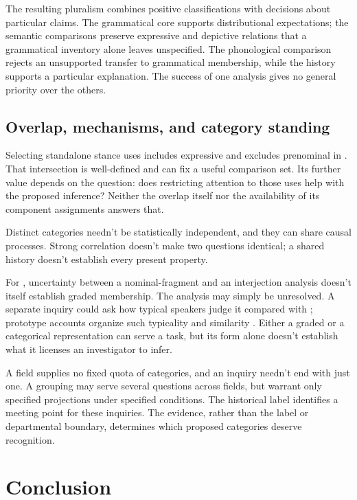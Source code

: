 \documentclass[12pt]{article}
\begin{document}
The resulting pluralism combines positive classifications with decisions
about particular claims. The grammatical core supports distributional
expectations; the semantic comparisons preserve expressive and depictive
relations that a grammatical inventory alone leaves unspecified.
The phonological comparison rejects an unsupported transfer to grammatical
membership, while the  history supports a particular explanation.
The success of one analysis gives no general priority over the others.

\subsection{Overlap, mechanisms, and category standing}

Selecting standalone stance uses includes expressive 
and excludes prenominal  in . That
intersection is well-defined and can fix a useful comparison set.
Its further value depends on the question: does restricting attention
to those uses help with the proposed inference? Neither the overlap
itself nor the availability of its component assignments answers that.

Distinct categories needn't be statistically independent, and they can
share causal processes. Strong correlation doesn't make two questions
identical; a shared history doesn't establish every present property.

For , uncertainty between a nominal-fragment and an
interjection analysis doesn't itself establish graded membership. The
analysis may simply be unresolved. A separate inquiry could ask how
typical speakers judge it compared with ; prototype
accounts organize such typicality and similarity \citep{rosch1975,taylor2003}.
Either a graded or a categorical representation can serve a task,
but its form alone doesn't establish what it licenses an investigator
to infer.

A field supplies no fixed quota of categories, and an inquiry
needn't end with just one. A grouping may serve several questions across
fields, but warrant only specified projections under specified conditions.
The historical label  identifies a meeting point for
these inquiries. The evidence, rather than the label or departmental
boundary, determines which proposed categories deserve recognition.

\section{Conclusion}\label{sec:conclusion}
\end{document}
